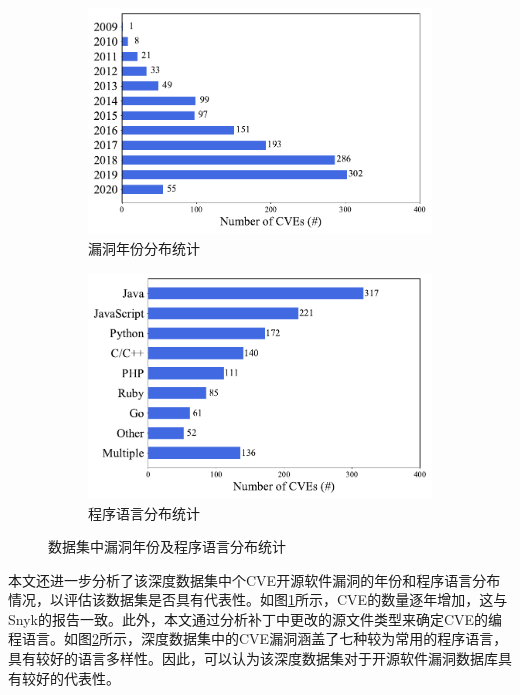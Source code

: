 \begin{figure}[h]
    \centering
    \begin{subfigure}[b]{0.45\textwidth}
    \centering
    \includegraphics[scale=0.46]{res/rq0-year.pdf}
    \caption{漏洞年份分布统计}\label{fig:rq0-year}
    \end{subfigure}
    \begin{subfigure}[b]{0.45\textwidth}
    \centering
    \includegraphics[scale=0.46]{res/rq0-language.pdf}
    \caption{程序语言分布统计}\label{fig:rq0-language}
    \end{subfigure}
    \caption{数据集中漏洞年份及程序语言分布统计}\label{fig:dataset}
\end{figure}


本文还进一步分析了该深度数据集中个CVE开源软件漏洞的年份和程序语言分布情况，以评估该数据集是否具有代表性。如图\ref{fig:rq0-year}所示，CVE的数量逐年增加，这与Snyk的报告\cite{Snyk-report}一致。此外，本文通过分析补丁中更改的源文件类型来确定CVE的编程语言。如图\ref{fig:rq0-language}所示，深度数据集中的CVE漏洞涵盖了七种较为常用的程序语言，具有较好的语言多样性。因此，可以认为该深度数据集对于开源软件漏洞数据库具有较好的代表性。


